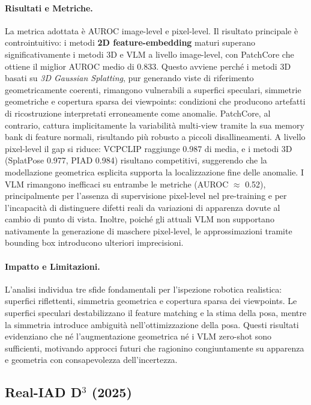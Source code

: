 \paragraph{Risultati e Metriche.} La metrica adottata è AUROC image-level e pixel-level. Il risultato principale è controintuitivo: i metodi \textbf{2D feature-embedding} maturi superano significativamente i metodi 3D e VLM a livello image-level, con PatchCore che ottiene il miglior AUROC medio di 0.833. Questo avviene perché i metodi 3D basati su \textit{3D Gaussian Splatting}, pur generando viste di riferimento geometricamente coerenti, rimangono vulnerabili a superfici speculari, simmetrie geometriche e copertura sparsa dei viewpoints: condizioni che producono artefatti di ricostruzione interpretati erroneamente come anomalie. PatchCore, al contrario, cattura implicitamente la variabilità multi-view tramite la sua memory bank di feature normali, risultando più robusto a piccoli disallineamenti. 
A livello pixel-level il gap si riduce: VCPCLIP raggiunge 0.987 di media, e i metodi 3D (SplatPose 0.977, PIAD 0.984) risultano competitivi, suggerendo che la modellazione geometrica esplicita supporta la localizzazione fine delle anomalie. I VLM rimangono inefficaci su entrambe le metriche (AUROC $\approx$ 0.52), principalmente per l'assenza di supervisione pixel-level nel pre-training e per l'incapacità di distinguere difetti reali da variazioni di apparenza dovute al cambio di punto di vista. Inoltre, poiché gli attuali VLM non supportano nativamente la generazione di maschere pixel-level, le approssimazioni tramite bounding box introducono ulteriori imprecisioni.


\paragraph{Impatto e Limitazioni.} L'analisi individua tre sfide fondamentali per l'i\-spe\-zio\-ne robotica realistica: superfici riflettenti, simmetria geometrica e copertura sparsa dei viewpoints. Le superfici speculari destabilizzano il feature matching e la stima della posa, mentre la simmetria introduce ambiguità nell'ottimizzazione della posa. Questi risultati evidenziano che né l'augmentazione geometrica né i VLM zero-shot sono sufficienti, motivando approcci futuri che ragionino congiuntamente su apparenza e geometria con consapevolezza dell'incertezza.



\subsection{Real-IAD {D$^3$} (2025)}
\label{sec:real_iad_d3}

